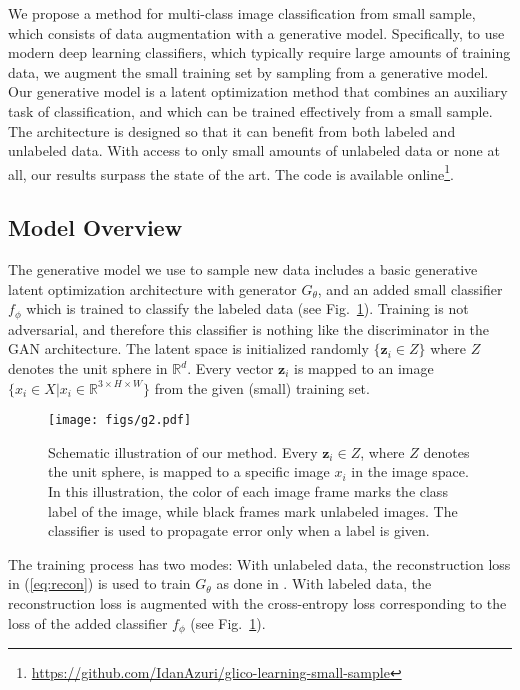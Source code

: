 \documentclass[a4paper,conference]{IEEEtran}
\newcommand{\bz}{{\mathbf z}}
\begin{document}
We propose a method for multi-class image classification from small sample, which consists of data augmentation with a generative model. Specifically, to use modern deep learning classifiers, which typically require large amounts of training data, we augment the small training set by sampling from a generative model. Our generative model is a latent optimization method that combines an auxiliary task of classification, and which can be trained effectively from a small sample. The architecture is designed so that it can benefit from both labeled and unlabeled data. With access to only small amounts of unlabeled data or none at all, our results surpass the state of the art. 
The code is available online\footnote{\url{https://github.com/IdanAzuri/glico-learning-small-sample}}.


\subsection{Model Overview}

The generative model we use to sample new data includes a basic generative latent optimization architecture with generator $G_\theta$, and an added small classifier $f_\phi$ which is trained to classify the labeled data (see Fig.~\ref{fig:our_method}). Training is not adversarial, and therefore this classifier is nothing like the discriminator in the GAN architecture. The latent space is initialized randomly $\{\bz_i\in Z\}$ where $Z$ denotes the unit sphere in $\mathbb{R}^d$. Every vector $\bz_i$ is mapped to an image $\{ x_i\in X | x_i \in \mathbb{R}^{3 \times H \times W} \}$ from the given (small) training set.
		
\begin{figure}[t]
\begin{center}
		\centerline{\texttt{[image: figs/g2.pdf]}}
		\caption{Schematic illustration of our method. Every $\bz_i\in Z$, where $Z$ denotes the unit sphere, is mapped to a specific image $x_i$ in the image space. In this illustration, the color of each image frame marks the class label of the image, while black frames mark unlabeled images. The classifier is used to propagate error only when a label is given.}
		\label{fig:our_method}
	\end{center}
	\vskip -0.1in
\end{figure}

The training process has two modes: With unlabeled data, the reconstruction loss in (\ref{eq:recon}) is used to train $G_\theta$ as done in \cite{pmlr-v80-bojanowski18a}. With labeled data, the reconstruction loss is augmented with the cross-entropy loss corresponding to the loss of the added classifier $f_\phi$ (see Fig.~\ref{fig:our_method}). 
\end{document}
